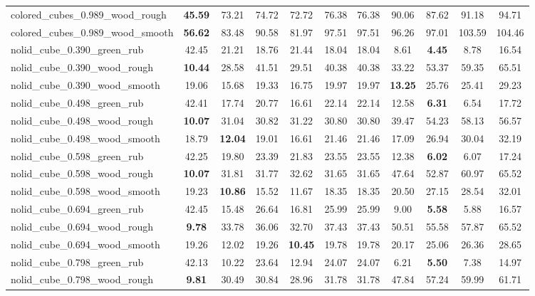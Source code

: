 \begin{table}[H]
{\begin{tabular}{l cccccccccc}
        colored\_cubes\_0.989\_wood\_rough & \textbf{45.59} & 73.21 & 74.72 & 72.72 & 76.38 & 76.38 & 90.06 & 87.62 & 91.18 & 94.71 \\
        colored\_cubes\_0.989\_wood\_smooth & \textbf{56.62} & 83.48 & 90.58 & 81.97 & 97.51 & 97.51 & 96.26 & 97.01 & 103.59 & 104.46 \\
        nolid\_cube\_0.390\_green\_rub & 42.45 & 21.21 & 18.76 & 21.44 & 18.04 & 18.04 & 8.61 & \textbf{4.45} & 8.78 & 16.54 \\
        nolid\_cube\_0.390\_wood\_rough & \textbf{10.44} & 28.58 & 41.51 & 29.51 & 40.38 & 40.38 & 33.22 & 53.37 & 59.35 & 65.51 \\
        nolid\_cube\_0.390\_wood\_smooth & 19.06 & 15.68 & 19.33 & 16.75 & 19.97 & 19.97 & \textbf{13.25} & 25.76 & 25.41 & 29.23 \\
        nolid\_cube\_0.498\_green\_rub & 42.41 & 17.74 & 20.77 & 16.61 & 22.14 & 22.14 & 12.58 & \textbf{6.31} & 6.54 & 17.72 \\
        nolid\_cube\_0.498\_wood\_rough & \textbf{10.07} & 31.04 & 30.82 & 31.22 & 30.80 & 30.80 & 39.47 & 54.23 & 58.13 & 56.57 \\
        nolid\_cube\_0.498\_wood\_smooth & 18.79 & \textbf{12.04} & 19.01 & 16.61 & 21.46 & 21.46 & 17.09 & 26.94 & 30.04 & 32.19 \\
        nolid\_cube\_0.598\_green\_rub & 42.25 & 19.80 & 23.39 & 21.83 & 23.55 & 23.55 & 12.38 & \textbf{6.02} & 6.07 & 17.24 \\
        nolid\_cube\_0.598\_wood\_rough & \textbf{10.07} & 31.81 & 31.77 & 32.62 & 31.65 & 31.65 & 47.64 & 52.87 & 60.97 & 65.52 \\
        nolid\_cube\_0.598\_wood\_smooth & 19.23 & \textbf{10.86} & 15.52 & 11.67 & 18.35 & 18.35 & 20.50 & 27.15 & 28.54 & 32.01 \\
        nolid\_cube\_0.694\_green\_rub & 42.45 & 15.48 & 26.64 & 16.81 & 25.99 & 25.99 & 9.00 & \textbf{5.58} & 5.88 & 16.57 \\
        nolid\_cube\_0.694\_wood\_rough & \textbf{9.78} & 33.78 & 36.06 & 32.70 & 37.43 & 37.43 & 50.51 & 55.58 & 57.87 & 65.52 \\
        nolid\_cube\_0.694\_wood\_smooth & 19.26 & 12.02 & 19.26 & \textbf{10.45} & 19.78 & 19.78 & 20.17 & 25.06 & 26.36 & 28.65 \\
        nolid\_cube\_0.798\_green\_rub & 42.13 & 10.22 & 23.64 & 12.94 & 24.07 & 24.07 & 6.21 & \textbf{5.50} & 7.38 & 14.97 \\
        nolid\_cube\_0.798\_wood\_rough & \textbf{9.81} & 30.49 & 30.84 & 28.96 & 31.78 & 31.78 & 47.84 & 57.24 & 59.99 & 61.71 \\

\end{tabular}}
\end{table}
